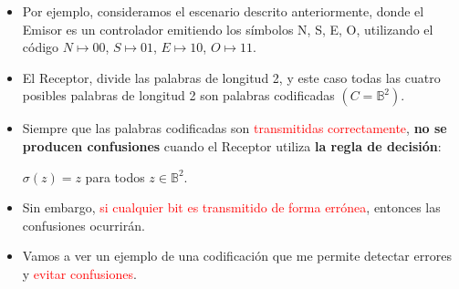 \documentclass{beamer}
\theoremstyle{plain}
\theoremstyle{example}
\theoremstyle{example}
\begin{document}
\begin{frame}  \small  
\begin{itemize} 

\item  Por ejemplo, consideramos el escenario descrito anteriormente, donde el Emisor es un controlador emitiendo los símbolos N, S, E, O, utilizando el código $N \mapsto 00$, $S \mapsto 01$, $E \mapsto 10$, $O \mapsto 11$. 

\item El Receptor, divide las palabras de longitud 2, y este caso todas las cuatro posibles palabras de longitud 2 son palabras codificadas $(C=\mathbb{B}^2)$. 

\item Siempre que las palabras codificadas son \textcolor{red}{transmitidas correctamente}, \textbf{no se producen confusiones} cuando el Receptor utiliza \textbf{la regla de decisión}: 

\begin{center}
$\sigma (z)=z$  para todos $z \in \mathbb{B}^2$.
\end{center}

\item Sin embargo, \textcolor{red}{si cualquier bit es transmitido de forma errónea}, entonces las confusiones ocurrirán. 

\item Vamos a ver un ejemplo de una codificación que me permite detectar errores y \textcolor{red}{evitar confusiones}.


\end{itemize} \end{frame} 
\end{document}
